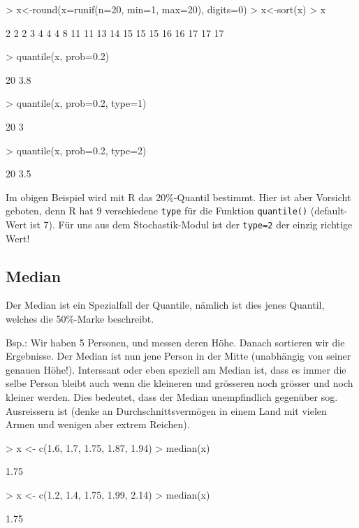 \begin{Schunk}
\begin{Sinput}
> x<-round(x=runif(n=20, min=1, max=20), digits=0)
> x<-sort(x)
> x
\end{Sinput}
\begin{Soutput}
 [1]  2  2  2  3  4  4  4  8 11 11 13 14 15 15 15 16 16 17 17 17
\end{Soutput}
\begin{Sinput}
> quantile(x, prob=0.2)
\end{Sinput}
\begin{Soutput}
20%
3.8 
\end{Soutput}
\begin{Sinput}
> quantile(x, prob=0.2, type=1)
\end{Sinput}
\begin{Soutput}
20%
  3 
\end{Soutput}
\begin{Sinput}
> quantile(x, prob=0.2, type=2)
\end{Sinput}
\begin{Soutput}
20%
3.5 
\end{Soutput}
\end{Schunk}
Im obigen Beispiel wird mit R das 20\%-Quantil bestimmt. Hier ist aber 
Vorsicht geboten, denn R hat 9 verschiedene \verb!type! für die Funktion
\verb!quantile()! (default-Wert ist 7). Für uns aus dem 
Stochastik-Modul ist der \verb!type=2! 
der einzig richtige Wert!

\subsection{Median}
Der Median ist ein Spezialfall der Quantile, nämlich ist dies jenes Quantil,
welches die 50\%-Marke beschreibt.

Bsp.: Wir haben 5 Personen, und messen deren Höhe. Danach sortieren wir die
Ergebnisse. Der Median ist nun jene Person in der Mitte (unabhängig von seiner
genauen Höhe!). Interssant oder eben speziell am Median ist,
dass es immer die selbe Person bleibt auch wenn die kleineren und grösseren
noch grösser und noch kleiner werden. Dies bedeutet, dass der Median 
unempfindlich gegenüber sog. Ausreissern ist (denke an Durchschnittsvermögen
in einem Land mit vielen Armen und wenigen aber extrem Reichen).
\begin{Schunk}
\begin{Sinput}
> x <- c(1.6, 1.7, 1.75, 1.87, 1.94)
> median(x)
\end{Sinput}
\begin{Soutput}
[1] 1.75
\end{Soutput}
\begin{Sinput}
> x <- c(1.2, 1.4, 1.75, 1.99, 2.14)
> median(x)
\end{Sinput}
\begin{Soutput}
[1] 1.75
\end{Soutput}
\end{Schunk}

